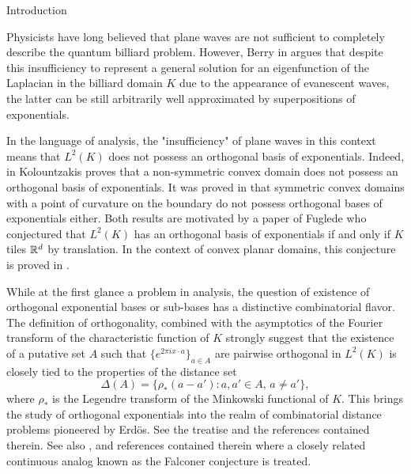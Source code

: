 \head Introduction \endhead

Physicists have long believed that plane waves are not
sufficient to completely describe the quantum billiard problem.
However, Berry in \cite{Berry94} argues that despite this
insufficiency to  represent a general  solution for an
eigenfunction of the Laplacian in the billiard domain $K$ due to
the appearance of evanescent waves, the latter can be still
arbitrarily well approximated by superpositions of exponentials.

In the language of analysis, the "insufficiency" of plane waves
in this context means that $L^2(K)$ does not possess an
orthogonal basis of exponentials. Indeed, in {\cite{Kol00}}
Kolountzakis proves that a non-symmetric convex domain does not
possess an orthogonal basis of exponentials. It was proved in
{\cite{IKT01}} that symmetric convex domains with a point of
curvature on the boundary do not possess orthogonal bases of
exponentials either. Both results are motivated by a paper of
Fuglede \cite{Fuglede74} who conjectured that $L^2(K)$ has an
orthogonal basis of exponentials if and only if $K$ tiles ${\Bbb
R}^d$ by translation. In the context of convex planar domains,
this conjecture is proved in \cite{IKT02}.

While at the first glance a problem in analysis, the question of
existence of orthogonal exponential bases or sub-bases has a
distinctive combinatorial flavor. The definition of
orthogonality, combined with the asymptotics of the Fourier
transform of the characteristic function of $K$ strongly suggest
that the existence of a putative set $A$ such that ${\{e^{2 \pi
i x \cdot a}\}}_{a \in A}$ are pairwise orthogonal in $L^2(K)$
is closely tied to the properties of the distance set
$$\Delta(A)=\{\rho_{*}(a-a'): a,a' \in A,\,a\neq a'\},$$ where $\rho_{*}$
is the Legendre transform of the Minkowski functional of $K$.
This brings the study of orthogonal exponentials into the  realm
of combinatorial distance problems pioneered by Erd\"{o}s. See
the treatise \cite{AP} and the references contained therein. See
also \cite{Falc87}, \cite{Wolff99} and references contained
therein where a closely related continuous analog known as the
Falconer conjecture is treated.

